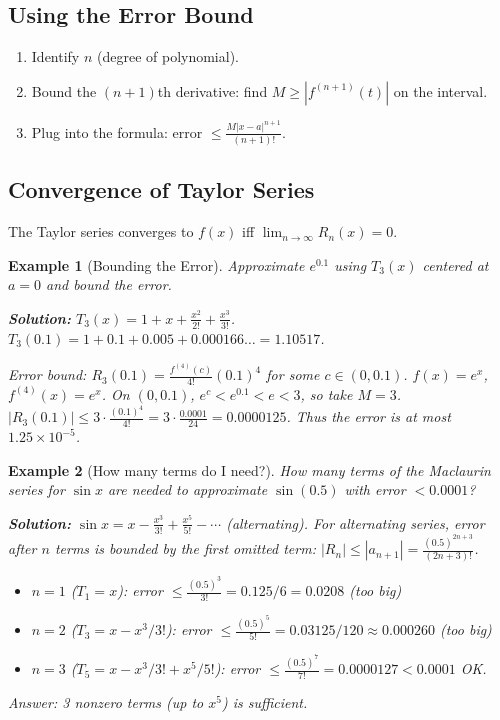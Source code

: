 \documentclass[12pt]{article}
\newtheorem{example}{Example}[section]
\begin{document}
\subsection{Using the Error Bound}
\begin{enumerate}
    \item Identify \(n\) (degree of polynomial).
    \item Bound the \((n+1)\)th derivative: find \(M\ge |f^{(n+1)}(t)|\) on the interval.
    \item Plug into the formula: error \(\le \frac{M|x-a|^{n+1}}{(n+1)!}\).
\end{enumerate}

\subsection{Convergence of Taylor Series}
The Taylor series converges to \(f(x)\) iff \(\lim_{n\to\infty} R_n(x)=0\).

\begin{example}[Bounding the Error]
Approximate \(e^{0.1}\) using \(T_3(x)\) centered at \(a=0\) and bound the error.

\textbf{Solution:} \(T_3(x)=1+x+\frac{x^2}{2!}+\frac{x^3}{3!}\).  
\(T_3(0.1)=1+0.1+0.005+0.000166\ldots=1.10517\).

Error bound: \(R_3(0.1)=\frac{f^{(4)}(c)}{4!}(0.1)^4\) for some \(c\in(0,0.1)\).  
\(f(x)=e^x\), \(f^{(4)}(x)=e^x\). On \((0,0.1)\), \(e^c < e^{0.1} < e < 3\), so take \(M=3\).  
\(|R_3(0.1)|\le 3\cdot\frac{(0.1)^4}{4!}=3\cdot\frac{0.0001}{24}=0.0000125\).  
Thus the error is at most \(1.25\times10^{-5}\).
\end{example}

\begin{example}[How many terms do I need?]
How many terms of the Maclaurin series for \(\sin x\) are needed to approximate \(\sin(0.5)\) with error \(<0.0001\)?

\textbf{Solution:} \(\sin x = x - \frac{x^3}{3!} + \frac{x^5}{5!} - \cdots\) (alternating). For alternating series, error after \(n\) terms is bounded by the first omitted term: \(|R_n|\le |a_{n+1}| = \frac{(0.5)^{2n+3}}{(2n+3)!}\).

\begin{itemize}
    \item \(n=1\) (\(T_1=x\)): error \(\le \frac{(0.5)^3}{3!}=0.125/6=0.0208\) (too big)
    \item \(n=2\) (\(T_3=x-x^3/3!\)): error \(\le \frac{(0.5)^5}{5!}=0.03125/120\approx0.000260\) (too big)
    \item \(n=3\) (\(T_5=x-x^3/3!+x^5/5!\)): error \(\le \frac{(0.5)^7}{7!}=0.0000127<0.0001\) OK.
\end{itemize}
Answer: 3 nonzero terms (up to \(x^5\)) is sufficient.
\end{example}
\end{document}
